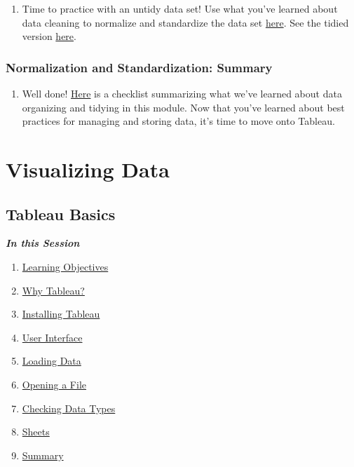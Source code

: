\documentclass[
]{book}
\providecommand{\tightlist}{%
  \setlength{\itemsep}{0pt}\setlength{\parskip}{0pt}}
\begin{document}
\begin{enumerate}
\def\labelenumi{\arabic{enumi}.}
\tightlist
\item
  Time to practice with an untidy data set! Use what you've learned about data cleaning to normalize and standardize the data set \href{files/M2S2_exercise.xlsx}{here}. See the tidied version \href{files/M2S3_exercise_key.xlsx}{here}.
\end{enumerate}

\hypertarget{normalization-and-standardization-summary}{%
\subsection{Normalization and Standardization: Summary}\label{normalization-and-standardization-summary}}

\begin{enumerate}
\def\labelenumi{\arabic{enumi}.}
\tightlist
\item
  Well done! \href{files/data_processing_checklist.docx}{Here} is a checklist summarizing what we've learned about data organizing and tidying in this module. Now that you've learned about best practices for managing and storing data, it's time to move onto Tableau.
\end{enumerate}

\hypertarget{visualizing-data}{%
\chapter{Visualizing Data}\label{visualizing-data}}

\hypertarget{tableau-basics}{%
\section{Tableau Basics}\label{tableau-basics}}

\textbf{\emph{In this Session}}

\begin{enumerate}
\def\labelenumi{\arabic{enumi}.}
\tightlist
\item
  \protect\hyperlink{tableau-basics-learning-objectives}{Learning Objectives}
\item
  \protect\hyperlink{why-tableau}{Why Tableau?}
\item
  \protect\hyperlink{installing-tableau}{Installing Tableau}
\item
  \protect\hyperlink{user-interface}{User Interface}
\item
  \protect\hyperlink{loading-data}{Loading Data}
\item
  \protect\hyperlink{opening-a-file}{Opening a File}
\item
  \protect\hyperlink{checking-data-types}{Checking Data Types}
\item
  \protect\hyperlink{sheets}{Sheets}
\item
  \protect\hyperlink{tableau-basics-summary}{Summary}
\end{enumerate}
\end{document}
